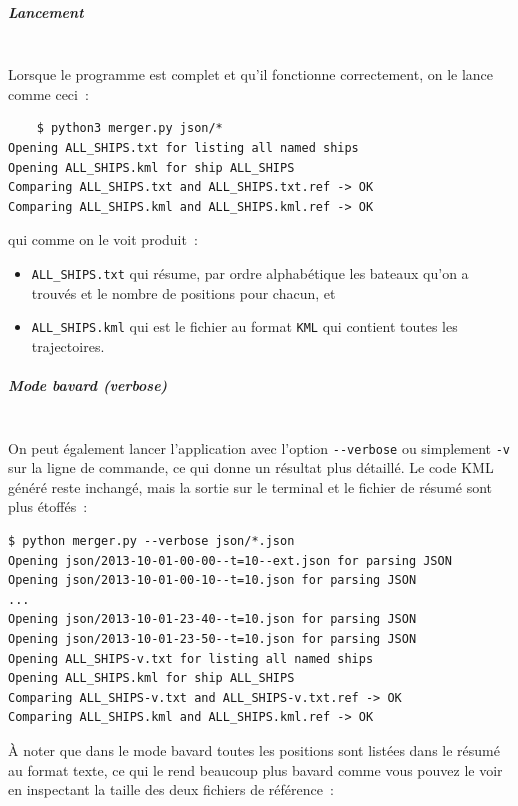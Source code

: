     \hypertarget{lancement}{%
\subparagraph{Lancement\\\\}\label{lancement}}

    Lorsque le programme est complet et qu'il fonctionne correctement, on le
lance comme ceci~:

\begin{verbatim}
    $ python3 merger.py json/*
Opening ALL_SHIPS.txt for listing all named ships
Opening ALL_SHIPS.kml for ship ALL_SHIPS
Comparing ALL_SHIPS.txt and ALL_SHIPS.txt.ref -> OK
Comparing ALL_SHIPS.kml and ALL_SHIPS.kml.ref -> OK
\end{verbatim}

qui comme on le voit produit~:

\begin{itemize}
\tightlist
\item
  \texttt{ALL\_SHIPS.txt} qui résume, par ordre alphabétique les bateaux
  qu'on a trouvés et le nombre de positions pour chacun, et
\item
  \texttt{ALL\_SHIPS.kml} qui est le fichier au format \texttt{KML} qui
  contient toutes les trajectoires.
\end{itemize}

    \hypertarget{mode-bavard-verbose}{%
\subparagraph{Mode bavard (verbose)\\\\}\label{mode-bavard-verbose}}

    On peut également lancer l'application avec l'option
\texttt{-\/-verbose} ou simplement \texttt{-v} sur la ligne de commande,
ce qui donne un résultat plus détaillé. Le code KML généré reste
inchangé, mais la sortie sur le terminal et le fichier de résumé sont
plus étoffés~:

\begin{verbatim}
$ python merger.py --verbose json/*.json
Opening json/2013-10-01-00-00--t=10--ext.json for parsing JSON
Opening json/2013-10-01-00-10--t=10.json for parsing JSON
...
Opening json/2013-10-01-23-40--t=10.json for parsing JSON
Opening json/2013-10-01-23-50--t=10.json for parsing JSON
Opening ALL_SHIPS-v.txt for listing all named ships
Opening ALL_SHIPS.kml for ship ALL_SHIPS
Comparing ALL_SHIPS-v.txt and ALL_SHIPS-v.txt.ref -> OK
Comparing ALL_SHIPS.kml and ALL_SHIPS.kml.ref -> OK
\end{verbatim}

À noter que dans le mode bavard toutes les positions sont listées dans
le résumé au format texte, ce qui le rend beaucoup plus bavard comme
vous pouvez le voir en inspectant la taille des deux fichiers de
référence~:

